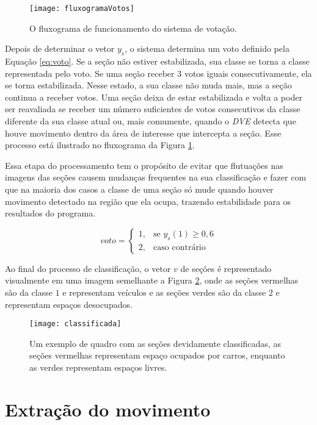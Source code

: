 \begin{figure}
	\centering
	\texttt{[image: fluxogramaVotos]}
	\caption{O fluxograma de funcionamento do sistema de votação.}
	\label{fig:fluxogramaVotos}
	\centering
\end{figure}


Depois de determinar o vetor $y_s$, o sistema determina um voto definido pela Equação \ref{eq:voto}.  Se a seção não estiver estabilizada, sua classe se torna a classe representada pelo voto. Se uma seção receber $3$ votos iguais consecutivamente, ela se torna estabilizada. Nesse estado, a sua classe não muda mais, mas a seção continua a receber votos. Uma seção deixa de estar estabilizada e volta a poder ser reavaliada se receber um número suficientes de votos consecutivos da classe diferente da sua classe atual ou, mais comumente, quando o \textit{DVE} detecta que houve movimento dentro da área de interesse que intercepta a seção. Esse processo está ilustrado no fluxograma da Figura \ref{fig:fluxogramaVotos}.

Essa etapa do processamento tem o propósito de evitar que flutuações nas imagens das seções causem mudanças frequentes na sua classificação e fazer com que na maioria dos casos a classe de uma seção só mude quando houver movimento detectado na região que ela ocupa, trazendo estabilidade para os resultados do programa.

\begin{equation}
voto= 
\begin{cases}
    1,& \text{se } y_s(1) \geq 0,6\\
    2,& \text{caso contrário}
\end{cases}
\label{eq:voto}
\end{equation}


Ao final do processo de classificação, o vetor $v$ de seções é representado visualmente em uma imagem semelhante a Figura \ref{fig:exemploClassificacao}, onde as seções vermelhas são da classe $1$ e representam veículos e as seções verdes são da classe $2$ e representam espaços desocupados.

\begin{figure}
\centering
\texttt{[image: classificada]}
\centering
\caption{Um exemplo de quadro com as seções devidamente classificadas, as seções vermelhas representam espaço ocupados por carros, enquanto as verdes representam espaços livres.}
\label{fig:exemploClassificacao}
\end{figure}

\section{Extração do movimento}


